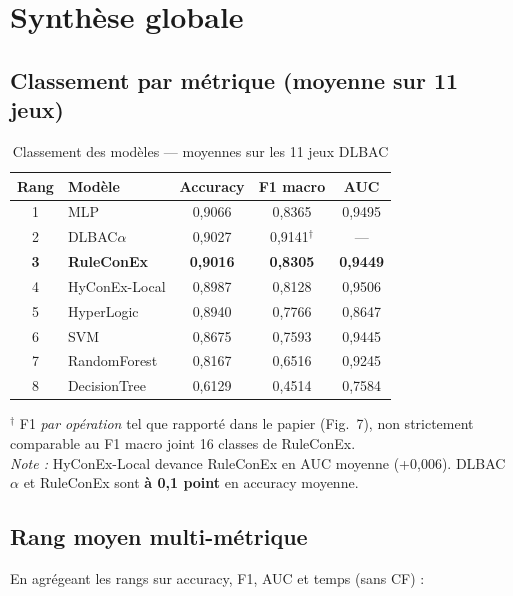 \documentclass[11pt,a4paper]{article}
\begin{document}
\section{Synthèse globale}

\subsection{Classement par métrique (moyenne sur 11 jeux)}

\begin{table}[h]
\centering
\caption{Classement des modèles — moyennes sur les 11 jeux DLBAC}
\label{tab:ranking}
\small
\begin{tabular}{@{}clccc@{}}
\toprule
\textbf{Rang} & \textbf{Modèle} & \textbf{Accuracy} & \textbf{F1 macro} & \textbf{AUC} \\
\midrule
1 & MLP & 0,9066 & 0,8365 & 0,9495 \\
2 & DLBAC$\alpha$ & 0,9027 & 0,9141$^\dagger$ & --- \\
\textbf{3} & \textbf{RuleConEx} & \textbf{0,9016} & \textbf{0,8305} & \textbf{0,9449} \\
4 & HyConEx-Local & 0,8987 & 0,8128 & 0,9506 \\
5 & HyperLogic & 0,8940 & 0,7766 & 0,8647 \\
6 & SVM & 0,8675 & 0,7593 & 0,9445 \\
7 & RandomForest & 0,8167 & 0,6516 & 0,9245 \\
8 & DecisionTree & 0,6129 & 0,4514 & 0,7584 \\
\bottomrule
\end{tabular}
\end{table}

\noindent
$^\dagger$ F1 \emph{par opération} tel que rapporté dans le papier (Fig.~7), non strictement comparable au F1 macro joint 16 classes de RuleConEx.\\
\textit{Note :} HyConEx-Local devance RuleConEx en AUC moyenne (+0,006). DLBAC$\alpha$ et RuleConEx sont \textbf{à 0,1 point} en accuracy moyenne.

\subsection{Rang moyen multi-métrique}

En agrégeant les rangs sur accuracy, F1, AUC et temps (sans CF) :
\end{document}
